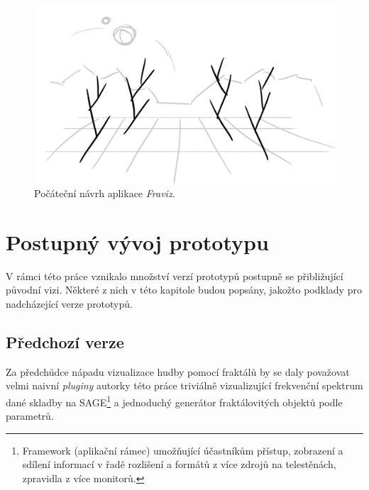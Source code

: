 \documentclass[thesis=B, czech]{FITthesis}[2019/03/06]
\begin{document}
\begin{figure}[h]
\centering
    \includegraphics[width=\textwidth]{images/fravizVize.png}
    \caption{ \label{fig:fravizVize}Počáteční návrh aplikace \textit{Fraviz}.}
\end{figure}



\chapter{Postupný vývoj prototypu}
\label{evolution}

V rámci této práce vznikalo množství verzí prototypů postupně se přibližující původní vizi. Některé z nich v této kapitole budou popsány, jakožto podklady pro nadcházející verze prototypů.

\section{Předchozí verze}

Za předchůdce nápadu vizualizace hudby pomocí fraktálů by se daly považovat velmi naivní \textit{pluginy} autorky této práce triviálně vizualizující frekvenční spektrum dané skladby na SAGE\footnote{Framework (aplikační rámec) umožňující účastníkům přístup, zobrazení a sdílení informací v řadě rozlišení a formátů z více zdrojů na telestěnách, zpravidla z více monitorů.} a jednoduchý generátor fraktálovitých objektů podle parametrů. 
\end{document}
